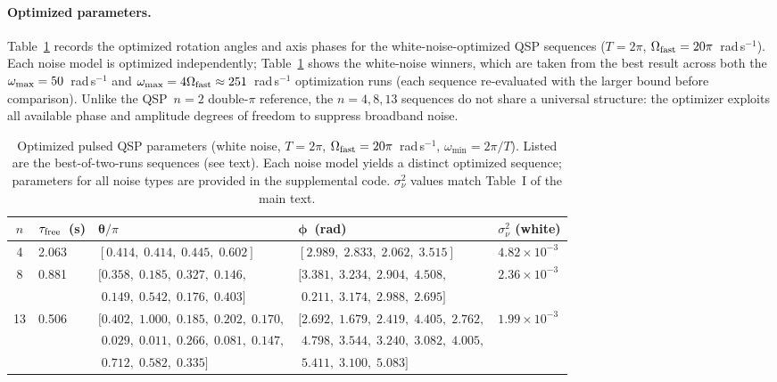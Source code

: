 \documentclass[aps,pra,twocolumn,superscriptaddress,longbibliography]{revtex4-2}
\begin{document}
\paragraph{Optimized parameters.}
Table~\ref{tab:qsp_params_supp} records the optimized rotation angles and axis
phases for the white-noise-optimized QSP sequences ($T=2\pi$,
$\Omega_{\rm fast}=20\pi$~rad\,s$^{-1}$).
Each noise model is optimized independently; Table~\ref{tab:qsp_params_supp} shows
the white-noise winners, which are taken from the best result across both the
$\omega_{\rm max}=50$~rad\,s$^{-1}$ and $\omega_{\rm max}=4\Omega_{\rm fast}\approx251$~rad\,s$^{-1}$
optimization runs (each sequence re-evaluated with the larger bound before comparison).
Unlike the QSP~$n{=}2$ double-$\pi$ reference, the $n{=}4,8,13$ sequences
do not share a universal structure: the optimizer exploits all available phase
and amplitude degrees of freedom to suppress broadband noise.

\begin{table}[t]
\caption{Optimized pulsed QSP parameters (white noise, $T=2\pi$,
$\Omega_{\rm fast}=20\pi$~rad\,s$^{-1}$, $\omega_{\min}=2\pi/T$).
Listed are the best-of-two-runs sequences (see text).
Each noise model yields a distinct optimized sequence; parameters for all
noise types are provided in the supplemental code.
$\sigma^2_\nu$ values match Table~I of the main text.}
\label{tab:qsp_params_supp}
\begin{ruledtabular}
\begin{tabular}{cllll}
$n$ & $\tau_{\rm free}$~(s) & $\boldsymbol{\theta}/\pi$ & $\boldsymbol{\phi}$~(rad)
    & $\sigma^2_\nu$ (white) \\
\hline
4 & 2.063
  & $[0.414,\;0.414,\;0.445,\;0.602]$
  & $[2.989,\;2.833,\;2.062,\;3.515]$
  & $4.82\times10^{-3}$ \\[3pt]
8 & 0.881
  & $[0.358,\;0.185,\;0.327,\;0.146,$
  & $[3.381,\;3.234,\;2.904,\;4.508,$
  & $2.36\times10^{-3}$ \\
  &
  & $\phantom{[}0.149,\;0.542,\;0.176,\;0.403]$
  & $\phantom{[}0.211,\;3.174,\;2.988,\;2.695]$
  & \\[3pt]
13 & 0.506
   & $[0.402,\;1.000,\;0.185,\;0.202,\;0.170,$
   & $[2.692,\;1.679,\;2.419,\;4.405,\;2.762,$
   & $1.99\times10^{-3}$ \\
   &
   & $\phantom{[}0.029,\;0.011,\;0.266,\;0.081,\;0.147,$
   & $\phantom{[}4.798,\;3.544,\;3.240,\;3.082,\;4.005,$
   & \\
   &
   & $\phantom{[}0.712,\;0.582,\;0.335]$
   & $\phantom{[}5.411,\;3.100,\;5.083]$
   & \\
\end{tabular}
\end{ruledtabular}
\end{table}
\end{document}
